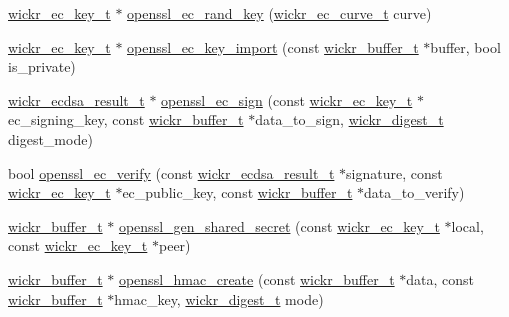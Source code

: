 \begin{DoxyCompactItemize}
\item 
\mbox{\hyperlink{structwickr__ec__key}{wickr\+\_\+ec\+\_\+key\+\_\+t}} $\ast$ \mbox{\hyperlink{group__openssl__crypto_ga75a01a740d558bfcc0f10920266cd9d5}{openssl\+\_\+ec\+\_\+rand\+\_\+key}} (\mbox{\hyperlink{structwickr__ec__curve}{wickr\+\_\+ec\+\_\+curve\+\_\+t}} curve)
\item 
\mbox{\hyperlink{structwickr__ec__key}{wickr\+\_\+ec\+\_\+key\+\_\+t}} $\ast$ \mbox{\hyperlink{group__openssl__crypto_gab2cc137ada900eba89796857603cd8cd}{openssl\+\_\+ec\+\_\+key\+\_\+import}} (const \mbox{\hyperlink{structwickr__buffer}{wickr\+\_\+buffer\+\_\+t}} $\ast$buffer, bool is\+\_\+private)
\item 
\mbox{\hyperlink{structwickr__ecdsa__result}{wickr\+\_\+ecdsa\+\_\+result\+\_\+t}} $\ast$ \mbox{\hyperlink{group__openssl__crypto_gab32cef5c789ee1992afae98a81b65823}{openssl\+\_\+ec\+\_\+sign}} (const \mbox{\hyperlink{structwickr__ec__key}{wickr\+\_\+ec\+\_\+key\+\_\+t}} $\ast$ec\+\_\+signing\+\_\+key, const \mbox{\hyperlink{structwickr__buffer}{wickr\+\_\+buffer\+\_\+t}} $\ast$data\+\_\+to\+\_\+sign, \mbox{\hyperlink{structwickr__digest}{wickr\+\_\+digest\+\_\+t}} digest\+\_\+mode)
\item 
bool \mbox{\hyperlink{group__openssl__crypto_ga1e2b3f17c67e97360b616d0d673767f7}{openssl\+\_\+ec\+\_\+verify}} (const \mbox{\hyperlink{structwickr__ecdsa__result}{wickr\+\_\+ecdsa\+\_\+result\+\_\+t}} $\ast$signature, const \mbox{\hyperlink{structwickr__ec__key}{wickr\+\_\+ec\+\_\+key\+\_\+t}} $\ast$ec\+\_\+public\+\_\+key, const \mbox{\hyperlink{structwickr__buffer}{wickr\+\_\+buffer\+\_\+t}} $\ast$data\+\_\+to\+\_\+verify)
\item 
\mbox{\hyperlink{structwickr__buffer}{wickr\+\_\+buffer\+\_\+t}} $\ast$ \mbox{\hyperlink{group__openssl__crypto_gac18a3e234621caaabf695715fb22d950}{openssl\+\_\+gen\+\_\+shared\+\_\+secret}} (const \mbox{\hyperlink{structwickr__ec__key}{wickr\+\_\+ec\+\_\+key\+\_\+t}} $\ast$local, const \mbox{\hyperlink{structwickr__ec__key}{wickr\+\_\+ec\+\_\+key\+\_\+t}} $\ast$peer)
\item 
\mbox{\hyperlink{structwickr__buffer}{wickr\+\_\+buffer\+\_\+t}} $\ast$ \mbox{\hyperlink{group__openssl__crypto_gaeb4574976214a17eb79bbc3d76f573a6}{openssl\+\_\+hmac\+\_\+create}} (const \mbox{\hyperlink{structwickr__buffer}{wickr\+\_\+buffer\+\_\+t}} $\ast$data, const \mbox{\hyperlink{structwickr__buffer}{wickr\+\_\+buffer\+\_\+t}} $\ast$hmac\+\_\+key, \mbox{\hyperlink{structwickr__digest}{wickr\+\_\+digest\+\_\+t}} mode)
\item 

\end{DoxyCompactItemize}
